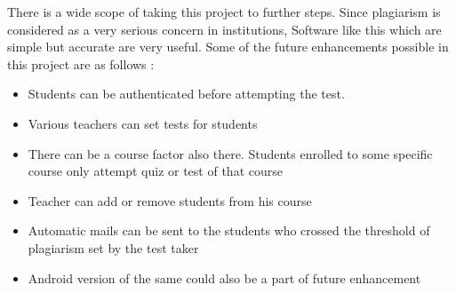 There is a wide scope of taking this project to further steps. Since plagiarism is considered as a very serious concern in institutions, Software like this which are simple but accurate are very useful. Some of the future enhancements possible in this project are as follows : 
\begin{itemize}
    \item Students can be authenticated before attempting the test.
    \item Various teachers can set tests for students
    \item There can be a course factor also there. Students enrolled to some specific course only attempt quiz or test of that course
    \item Teacher can add or remove students from his course
    \item Automatic mails can be sent to the students who crossed the threshold of plagiarism set by the test taker
    \item Android version of the same could also be a part of future enhancement
\end{itemize}
